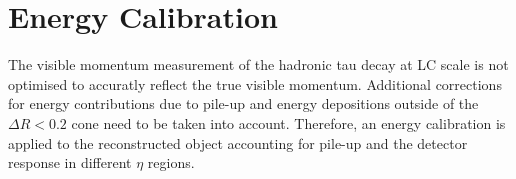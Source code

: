 
%
%
%
%
%

\section{Energy Calibration}
\label{sec:reco_energy_calib}
%
%
%
The visible momentum measurement of the hadronic tau decay at LC scale is not
optimised to accuratly reflect the true visible momentum. Additional corrections
for energy contributions due to pile-up and energy depositions outside of the
$\Delta R < 0.2$ cone need to be taken into account. Therefore, an energy
calibration is applied to the reconstructed object accounting for pile-up and
the detector response in different $\eta$ regions.


